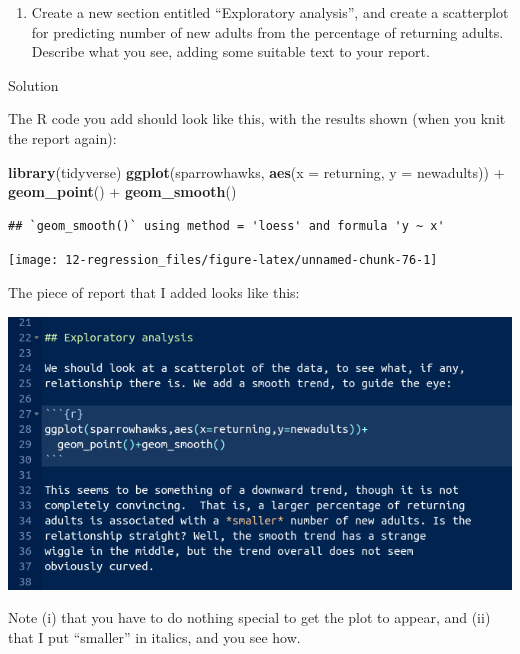 \documentclass[]{tufte-book}
\newenvironment{Shaded}{}{}
\newcommand{\DataTypeTok}[1]{\textcolor[rgb]{0.56,0.13,0.00}{#1}}
\newcommand{\KeywordTok}[1]{\textcolor[rgb]{0.00,0.44,0.13}{\textbf{#1}}}
\newcommand{\NormalTok}[1]{#1}
\newcommand{\OperatorTok}[1]{\textcolor[rgb]{0.40,0.40,0.40}{#1}}
\newcommand{\StringTok}[1]{\textcolor[rgb]{0.25,0.44,0.63}{#1}}
\providecommand{\tightlist}{%
  \setlength{\itemsep}{0pt}\setlength{\parskip}{0pt}}
\theoremstyle{definition}
\theoremstyle{definition}
\theoremstyle{definition}
\theoremstyle{remark}
\begin{document}
\begin{enumerate}
\def\labelenumi{(\alph{enumi})}
\setcounter{enumi}{2}
\tightlist
\item
  Create a new section entitled ``Exploratory analysis'', and create a
  scatterplot for predicting number of new adults from the percentage of
  returning adults. Describe what you see, adding some suitable text to
  your report.
\end{enumerate}

Solution

The R code you add should look like this, with the results shown (when
you knit the report again):

\begin{Shaded}
\begin{Highlighting}[]
\KeywordTok{library}\NormalTok{(tidyverse)}
\KeywordTok{ggplot}\NormalTok{(sparrowhawks, }\KeywordTok{aes}\NormalTok{(}\DataTypeTok{x =}\NormalTok{ returning, }\DataTypeTok{y =}\NormalTok{ newadults)) }\OperatorTok{+}\StringTok{ }
\StringTok{    }\KeywordTok{geom_point}\NormalTok{() }\OperatorTok{+}\StringTok{ }\KeywordTok{geom_smooth}\NormalTok{()}
\end{Highlighting}
\end{Shaded}

\begin{verbatim}
## `geom_smooth()` using method = 'loess' and formula 'y ~ x'
\end{verbatim}

\texttt{[image: 12-regression\_files/figure-latex/unnamed-chunk-76-1]}

The piece of report that I added looks like this:

\includegraphics{sh4.png}

Note (i) that you have to do nothing special to get the plot to appear,
and (ii) that I put ``smaller'' in italics, and you see how.
\end{document}
